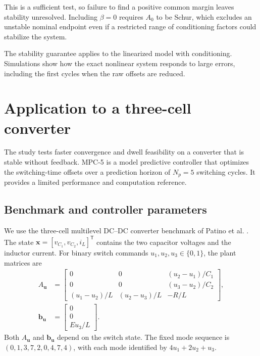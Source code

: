 \documentclass[pdflatex,iicol,sn-mathphys-ay]{sn-jnl}
\newcommand{\vect}[1]{\bm{#1}}
\begin{document}
This is a sufficient test, so failure to find a positive common margin leaves stability unresolved. Including $\beta=0$ requires $A_0$ to be Schur, which excludes an unstable nominal endpoint even if a restricted range of conditioning factors could stabilize the system.

The stability guarantee applies to the linearized model with conditioning. Simulations show how the exact nonlinear system responds to large errors, including the first cycles when the raw offsets are reduced.

\section{Application to a three-cell converter}
\label{sec:case-study}

The study tests faster convergence and dwell feasibility on a converter that is stable without feedback. MPC-5 is a model predictive controller that optimizes the switching-time offsets over a prediction horizon of $N_p=5$ switching cycles. It provides a limited performance and computation reference.

\subsection{Benchmark and controller parameters}

We use the three-cell multilevel DC--DC converter benchmark of Patino et al. \cite{patino2010}. The state $\vect{x}=[v_{C_1},v_{C_2},i_L]^{\mathsf T}$ contains the two capacitor voltages and the inductor current. For binary switch commands $u_1,u_2,u_3\in\{0,1\}$, the plant matrices are
\begin{equation}
\begin{aligned}
A_{\vect{u}}&=\begin{bmatrix}
0&0&(u_2-u_1)/C_1\\
0&0&(u_3-u_2)/C_2\\
(u_1-u_2)/L&(u_2-u_3)/L&-R/L
\end{bmatrix},\\
\vect{b}_{\vect{u}}&=\begin{bmatrix}0\\0\\Eu_3/L\end{bmatrix}.
\end{aligned}
\label{eq:converter}
\end{equation}
Both $A_{\vect{u}}$ and $\vect{b}_{\vect{u}}$ depend on the switch state. The fixed mode sequence is $(0,1,3,7,2,0,4,7,4)$, with each mode identified by $4u_1+2u_2+u_3$.
\end{document}
